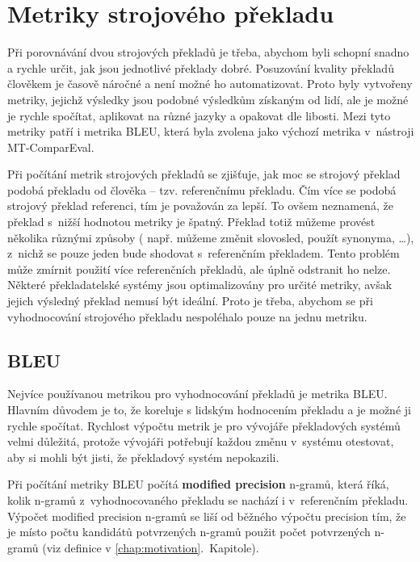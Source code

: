 \chapter{Metriky strojového překladu}
\label{chap:metrics}

Při porovnávání dvou strojových překladů je třeba,
  abychom byli schopní snadno a rychle určit,
  jak jsou jednotlivé překlady dobré.
Posuzování kvality překladů člověkem je časově náročné
  a není možné ho automatizovat.
Proto byly vytvořeny metriky,
  jejichž výsledky jsou podobné výsledkům získaným od lidí,
  ale je možné je rychle spočítat,
  aplikovat na různé jazyky a opakovat dle libosti.
Mezi tyto metriky patří i metrika BLEU,
  která byla zvolena jako výchozí metrika v~nástroji \mbox{MT-ComparEval}.

Při počítání metrik strojových překladů se zjišťuje,
  jak moc se strojový překlad podobá překladu od člověka -- tzv. referenčnímu překladu.
Čím více se podobá strojový překlad referenci,
  tím je považován za lepší.
To ovšem neznamená, že překlad s~nižší hodnotou metriky je špatný.
Překlad totiž můžeme provést několika různými způsoby 
  ( např. můžeme změnit slovosled, použít synonyma, \dots ),
  z~nichž se pouze jeden bude shodovat s~referenčním překladem.
Tento problém může zmírnit použití více referenčních překladů,
  ale úplně odstranit ho nelze.
Některé překladatelské systémy jsou optimalizovány pro určité metriky,
  avšak jejich výsledný překlad nemusí být ideální.
Proto je třeba,
  abychom se při vyhodnocování strojového překladu nespoléhalo pouze na jednu metriku.


\section{BLEU}
Nejvíce používanou metrikou pro vyhodnocování překladů je metrika BLEU.
Hlavním důvodem je to,
  že koreluje s lidským hodnocením překladu
  a je možné ji rychle spočítat.
Rychlost výpočtu metrik je pro vývojáře překladových systémů velmi důležitá,
  protože vývojáři potřebují každou změnu v~systému otestovat,
  aby si mohli být jisti,
  že překladový systém nepokazili.

Při počítání metriky BLEU počítá \textbf{modified precision} \mbox{n-gramů},
  která říká,
  kolik \mbox{n-gramů} z~vyhodnocovaného překladu se nachází i v~referenčním překladu.	
Výpočet modified precision \mbox{n-gramů} se liší od běžného výpočtu precision tím,
  že je místo počtu kandidátů potvrzených n-gramů použit počet potvrzených n-gramů (viz definice v \ref{chap:motivation}.~Kapitole).

